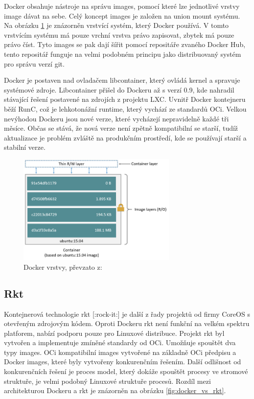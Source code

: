 Docker obsahuje nástroje na správu images, pomocí které lze jednotlivé vrstvy image dávat na sebe. Celý koncept images je založen na union mount systému\cite{Docker_OD}. Na obrázku \ref{fig:docker_layers} je znázorněn vrstvící systém, který Docker používá. V tomto vrstvícím systému má pouze vrchní vrstva právo zapisovat, zbytek má pouze právo číst. Tyto images se pak dají šířit pomocí repositáře zvaného Docker Hub, tento repositář funguje na velmi podobném principu jako distribuovaný systém pro správu verzí git. 

Docker je postaven nad ovladačem libcontainer, který ovládá kernel a spravuje systémové zdroje. Libcontainer přišel do Dockeru až s verzí 0.9\cite{docker_lib}, kde nahradil stávající řešení postavené na zdrojích z projektu LXC. Uvnitř Docker kontejneru běží RunC, což je lehkotonážní runtime, který vychází ze standardů OCi. Velkou nevýhodou Dockeru jsou nové verze, které vycházejí nepravidelně každé tři měsíce. Občas se stává, že nová verze není zpětně kompatibilní se starší, tudíž aktualizace je problém zvláště na produkčním prostředí, kde se používají starší a stabilní verze. 

\begin{figure}[H]
\begin{centering}
\includegraphics[width=0.7\textwidth]{img/docker_layers}
\par\end{centering}
\caption{Docker vrstvy, převzato z: \cite{Docker_doc_layers} \label{fig:docker_layers}}
\end{figure}

\subsection{Rkt}
Kontejnerová technologie rkt [:rock-it:] je další z řady projektů od firmy CoreOS s otevřeným zdrojovým kódem. Oproti Dockeru rkt není funkční na velkém spektru platforem, nabízí podporu pouze pro Linuxové distribuce. Projekt rkt byl vytvořen a implementuje zmíněné standardy od OCi\cite{coreos_00}. Umožňuje spouštět dva typy images. OCi kompatibilní images vytvořené na základně OCi předpisu a Docker images, které byly vytvořeny konkurenčním řešením. Další odlišnost od konkurenčních řešení je proces model, který dokáže spouštět procesy ve stromové struktuře, je velmi podobný Linuxové struktuře procesů. Rozdíl mezi architekturou Dockeru a rkt je znázorněn na obrázku  \ref{fig:docker_vs_rkt}. 

